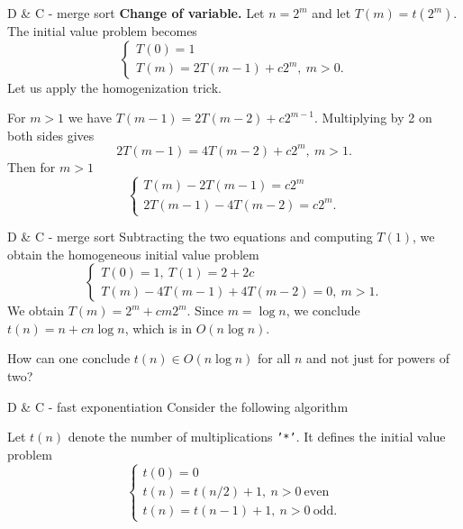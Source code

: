 \documentclass{beamer}
\begin{document}
%

\begin{frame}{D \& C - merge sort}
	\textbf{Change of variable.} Let $n= 2^m$ and let $T(m)= t(2^m)$.
	The initial value problem becomes
	\[
		\begin{cases}
			T(0)= 1\\
			T(m)= 2T(m-1) + c2^m,\ m > 0.
		\end{cases}
	\]
	Let us apply the homogenization trick.

	\bigskip
	For $m > 1$ we have $T(m-1) = 2T(m-2) + c2^{m-1}$. Multiplying by 2 on
	both sides gives
	\[
		2T(m-1) = 4T(m-2) + c2^m,\ m > 1.
	\]
	Then for $m > 1$
	\[
		\begin{cases}
			T(m) - 2T(m-1) = c2^m\\
			2T(m-1) - 4T(m-2) = c2^m.
		\end{cases}
	\]
\end{frame}

%

\begin{frame}{D \& C - merge sort}
	Subtracting the two equations and computing $T(1)$, we obtain the homogeneous
	initial value problem
	\[
		\begin{cases}
			T(0)= 1,\ T(1)= 2 + 2c\\
			T(m) - 4T(m-1) + 4T(m-2)= 0,\ m > 1.
		\end{cases}
	\]
	We obtain $T(m) = 2^m + cm2^m$. Since $m = \log n$, we conclude
	$t(n) = n + cn\log n$, which is in $O(n\log n)$.
	\begin{qtn}
		How can one conclude $t(n) \in O(n\log n)$ for all $n$ and not
		just for powers of two?
	\end{qtn}
\end{frame}

%

\begin{frame}{D \& C - fast exponentiation}
	Consider the following algorithm
	
	
	
	Let $t(n)$ denote the number of multiplications \texttt{'*'}. It defines the
	initial value problem
	\[
		\begin{cases}
			t(0)= 0\\
			t(n)= t(n/2) + 1,\ n > 0\ \text{even}\\
			t(n)= t(n-1) + 1,\ n > 0\ \text{odd}.
		\end{cases}
	\]
\end{frame}
\end{document}
